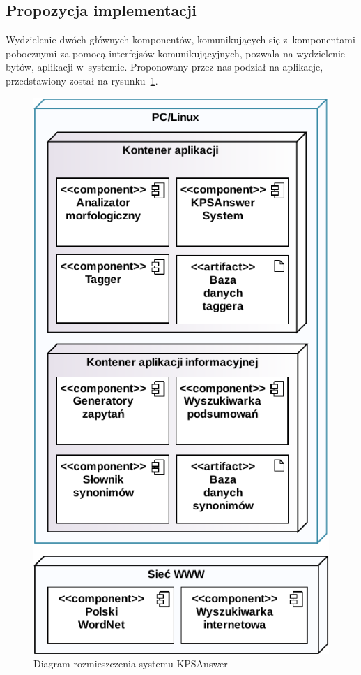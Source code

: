 \subsection{Propozycja implementacji}
Wydzielenie dwóch głównych komponentów, komunikujących się z~komponentami pobocznymi za pomocą interfejsów komunikującyjnych, pozwala na wydzielenie bytów, aplikacji w~systemie. Proponowany przez nas podział na aplikacje, przedstawiony został na rysunku~\ref{fig:system-deployment}.

\begin{figure}[h!]
    \centering
    \includegraphics[width=0.8\columnwidth]{figures/WEDT-Deployment.pdf}
    \caption{Diagram rozmieszczenia systemu KPSAnswer}
    \label{fig:system-deployment}
\end{figure}

